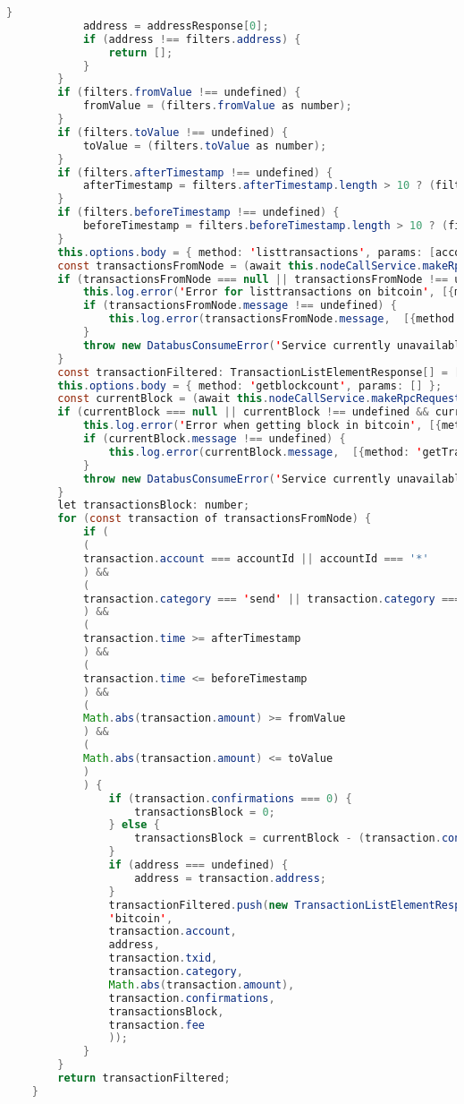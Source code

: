 \begin{lstlisting}[language=java]
			}
			address = addressResponse[0];
			if (address !== filters.address) {
				return [];
			}
		}
		if (filters.fromValue !== undefined) {
			fromValue = (filters.fromValue as number);
		}
		if (filters.toValue !== undefined) {
			toValue = (filters.toValue as number);
		}
		if (filters.afterTimestamp !== undefined) {
			afterTimestamp = filters.afterTimestamp.length > 10 ? (filters.afterTimestamp.slice(0, 10) as number) : (filters.afterTimestamp as number);
		}
		if (filters.beforeTimestamp !== undefined) {
			beforeTimestamp = filters.beforeTimestamp.length > 10 ? (filters.beforeTimestamp.slice(0, 10) as number) : (filters.beforeTimestamp as number);
		}
		this.options.body = { method: 'listtransactions', params: [accountId, 99999999] };
		const transactionsFromNode = (await this.nodeCallService.makeRpcRequest(this.options))[0];
		if (transactionsFromNode === null || transactionsFromNode !== undefined && transactionsFromNode.error !== undefined) {
			this.log.error('Error for listtransactions on bitcoin', [{method: 'getTransactions'}]);
			if (transactionsFromNode.message !== undefined) {
				this.log.error(transactionsFromNode.message,  [{method: 'getTransactions'}]);
			}
			throw new DatabusConsumeError('Service currently unavailable');
		}
		const transactionFiltered: TransactionListElementResponse[] = [];
		this.options.body = { method: 'getblockcount', params: [] };
		const currentBlock = (await this.nodeCallService.makeRpcRequest(this.options))[0];
		if (currentBlock === null || currentBlock !== undefined && currentBlock.error !== undefined) {
			this.log.error('Error when getting block in bitcoin', [{method: 'getTransactions'}]);
			if (currentBlock.message !== undefined) {
				this.log.error(currentBlock.message,  [{method: 'getTransactions'}]);
			}
			throw new DatabusConsumeError('Service currently unavailable');
		}
		let transactionsBlock: number;
		for (const transaction of transactionsFromNode) {
			if (
			(
			transaction.account === accountId || accountId === '*'
			) &&
			(
			transaction.category === 'send' || transaction.category === 'receive'
			) &&
			(
			transaction.time >= afterTimestamp
			) &&
			(
			transaction.time <= beforeTimestamp
			) &&
			(
			Math.abs(transaction.amount) >= fromValue
			) &&
			(
			Math.abs(transaction.amount) <= toValue
			)
			) {
				if (transaction.confirmations === 0) {
					transactionsBlock = 0;
				} else {
					transactionsBlock = currentBlock - (transaction.confirmations - 1);
				}
				if (address === undefined) {
					address = transaction.address;
				}
				transactionFiltered.push(new TransactionListElementResponse(
				'bitcoin',
				transaction.account,
				address,
				transaction.txid,
				transaction.category,
				Math.abs(transaction.amount),
				transaction.confirmations,
				transactionsBlock,
				transaction.fee
				));
			}
		}
		return transactionFiltered;
	}
	

\end{lstlisting}
